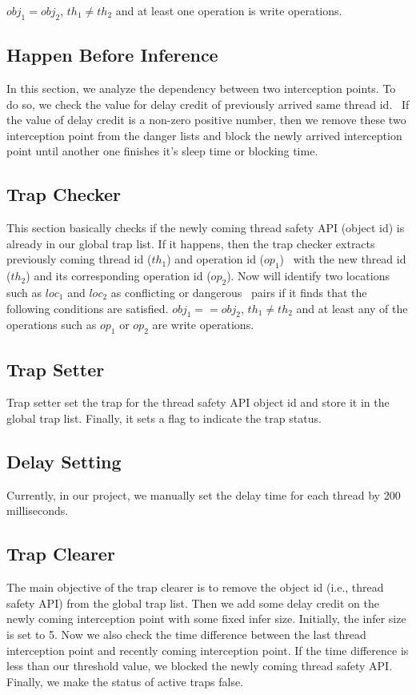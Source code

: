 $obj_1 = obj_2$, $th_1 \neq th_2$ and at least one operation is write operations.

\subsection{Happen Before Inference} In this section, we analyze the dependency
between two interception points. To do so, we check the value for delay credit
of previously arrived same thread id.   If the value of delay credit is a non-zero positive number, then we remove these two
interception point from the danger lists and block the newly arrived
interception point until another one finishes it's sleep time or blocking time.

\subsection{Trap Checker}
This section basically checks if the newly coming thread safety API (object id)
is already in our global trap list. If it happens, then the trap checker
extracts previously coming thread id ($th_1$) and operation id ($op_1$)  with the new thread id ($th_2$)
and its corresponding operation id ($op_2$). Now \Toolname{} will identify two locations such as $loc_1$ and $loc_2$ as conflicting or dangerous  pairs if it finds that the following conditions are satisfied.
$obj_1 == obj_2$, $th_1 \neq th_2$ and at least any of the operations such as $op_1$ or $op_2$ are write operations.


\subsection{Trap Setter}
Trap setter set the trap for the thread safety API object id and store it in the global trap list. Finally, it sets a flag to indicate the trap status.

\subsection{Delay Setting}
Currently, in our project, we manually set the delay time for each thread by 200 milliseconds.




\subsection{Trap Clearer}
The main objective of the trap clearer is to remove
the object id (i.e., thread safety API) from the global trap list. Then we
add some delay credit on the newly coming interception point with some fixed
infer size. Initially, the infer size is set to 5. Now we also check the
time difference between the last thread interception point and recently coming
interception point. If the time difference is less than our threshold value, we
blocked the newly coming thread safety API. Finally, we make the status of
active traps false.


